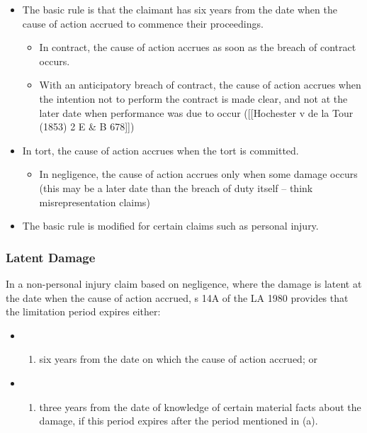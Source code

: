 \documentclass[
]{article}
\providecommand{\tightlist}{%
  \setlength{\itemsep}{0pt}\setlength{\parskip}{0pt}}
\begin{document}
\begin{itemize}
\tightlist
\item
  The basic rule is that the claimant has six years from the date when
  the cause of action accrued to commence their proceedings.

  \begin{itemize}
  \tightlist
  \item
    In contract, the cause of action accrues as soon as the breach of
    contract occurs.
  \item
    With an anticipatory breach of contract, the cause of action accrues
    when the intention not to perform the contract is made clear, and
    not at the later date when performance was due to occur
    ({[}{[}Hochester v de la Tour (1853) 2 E \& B 678{]}{]})
  \end{itemize}
\item
  In tort, the cause of action accrues when the tort is committed.

  \begin{itemize}
  \tightlist
  \item
    In negligence, the cause of action accrues only when some damage
    occurs (this may be a later date than the breach of duty itself --
    think misrepresentation claims)
  \end{itemize}
\item
  The basic rule is modified for certain claims such as personal injury.
\end{itemize}

\hypertarget{latent-damage}{%
\subsubsection{Latent Damage}\label{latent-damage}}

In a non-personal injury claim based on negligence, where the damage is
latent at the date when the cause of action accrued, s 14A of the LA
1980 provides that the limitation period expires either:

\begin{itemize}
\item
  \begin{enumerate}
  \def\labelenumi{(\alph{enumi})}
  \tightlist
  \item
    six years from the date on which the cause of action accrued; or
  \end{enumerate}
\item
  \begin{enumerate}
  \def\labelenumi{(\alph{enumi})}
  \setcounter{enumi}{1}
  \tightlist
  \item
    three years from the date of knowledge of certain material facts
    about the damage, if this period expires after the period mentioned
    in (a).
  \end{enumerate}
\end{itemize}
\end{document}
